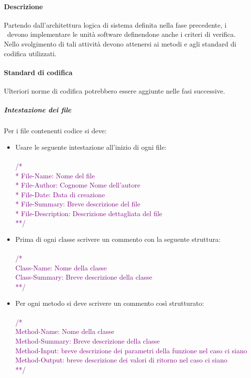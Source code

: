\documentclass[../NormeDiProgetto.tex]{subfiles}
\begin{document}
			\paragraph{Descrizione\\}
				Partendo dall'architettura logica di sistema definita nella fase precedente, i
				\programmatori\ devono implementare le unità software definendone anche i criteri di
				verifica. Nello svolgimento di tali attività devono attenersi ai metodi e
				agli standard di codifica utilizzati.
			\paragraph{Standard di codifica\\}
				Ulteriori norme di codifica potrebbero essere aggiunte nelle fasi successive.
				\subparagraph{Intestazione dei file\\}
					Per i file contenenti codice si deve:
					\begin{itemize}
						\item Usare le seguente intestazione all'inizio di ogni file:\\
						\textcolor{purple}{	\\/*\\
							* File-Name: Nome del file\\
							* File-Author: Cognome Nome dell'autore\\
							* File-Date: Data di creazione\\
							* File-Summary: Breve descrizione del file\\
							* File-Description: Descrizione dettagliata del file\\
							**/}
						\item Prima di ogni classe scrivere un commento con la seguente struttura:\\
						\textcolor{purple}{	\\/*\\
							Class-Name: Nome della classe\\
							Class-Summary: Breve descrizione della classe\\
							**/}
						\item Per ogni metodo si deve scrivere un commento così strutturato:\\
						\textcolor{purple}{	\\/*\\
							Method-Name: Nome della classe\\
							Method-Summary: Breve descrizione della classe\\
							Method-Input: breve descrizione dei parametri della funzione nel caso
							ci siano\\
							Method-Output: breve descrizione dei valori di ritorno nel caso ci siano\\ 
							**/ }
					\end{itemize}
\end{document}

